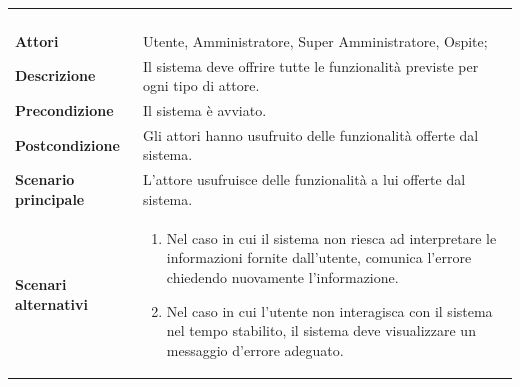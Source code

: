 \begin{longtable}{l|p{10cm}}
\rowcolor[gray]{0.8} \multicolumn{2}{c}{} \\
\rowcolor[gray]{0.8} \multicolumn{2}{c}{\textbf{UCG - Scenario principale}} \\
\rowcolor[gray]{0.8} \multicolumn{2}{c}{} \\
\hline
&\\
\textbf{Attori} & Utente, Amministratore, Super Amministratore, Ospite;\\[7pt]
\textbf{Descrizione} & Il sistema deve offrire tutte le funzionalità previste per ogni tipo di attore.\\[7pt]
\textbf{Precondizione} & Il sistema è avviato.\\[7pt]
\textbf{Postcondizione} & Gli attori hanno usufruito delle funzionalità offerte dal sistema.\\[7pt]
\textbf{Scenario principale} & L'attore usufruisce delle funzionalità a lui offerte dal sistema.\\[7pt]
\textbf{Scenari alternativi} & 
\begin{enumerate}
 \item Nel caso in cui il sistema non riesca ad interpretare le informazioni fornite dall'utente, comunica l'errore chiedendo nuovamente l'informazione.
 \item Nel caso in cui l'utente non interagisca con il sistema nel tempo stabilito, il sistema deve visualizzare un messaggio d'errore adeguato.
\end{enumerate}\\[7pt]\hline
\end{longtable}

\newpage
